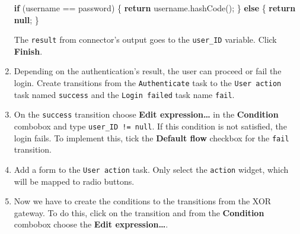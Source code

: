 \documentclass[]{report}
\newenvironment{Shaded}{}{}
\newcommand{\KeywordTok}[1]{\textcolor[rgb]{0.00,0.44,0.13}{\textbf{{#1}}}}
\newcommand{\FunctionTok}[1]{\textcolor[rgb]{0.02,0.16,0.49}{{#1}}}
\newcommand{\NormalTok}[1]{{#1}}
\begin{document}
\begin{enumerate}
\begin{Shaded}
\begin{Highlighting}[]
\KeywordTok{if} \NormalTok{(username == password) \{}
  \KeywordTok{return} \NormalTok{username.}\FunctionTok{hashCode}\NormalTok{(); }
\NormalTok{\} }\KeywordTok{else} \NormalTok{\{ }
  \KeywordTok{return} \KeywordTok{null}\NormalTok{;}
\NormalTok{\}}
\end{Highlighting}
\end{Shaded}

  The \texttt{result} from connector's output goes to the
  \texttt{user\_ID} variable. Click \textbf{Finish}.
\item
  Depending on the authentication's result, the user can proceed or fail
  the login. Create transitions from the \texttt{Authenticate} task to
  the \texttt{User action} task named \texttt{success} and the
  \texttt{Login failed} task name \texttt{fail}.
\item
  On the \texttt{success} transition choose \textbf{Edit
  expression\ldots{}} in the \textbf{Condition} combobox and type
  \texttt{user\_ID != null}. If this condition is not satisfied, the
  login fails. To implement this, tick the \textbf{Default flow}
  checkbox for the \texttt{fail} transition.
\item
  Add a form to the \texttt{User action} task. Only select the
  \texttt{action} widget, which will be mapped to radio buttons.
\item
  Now we have to create the conditions to the transitions from the XOR
  gateway. To do this, click on the transition and from the
  \textbf{Condition} combobox choose the \textbf{Edit
  expression\ldots{}}.


\end{enumerate}
\end{document}
